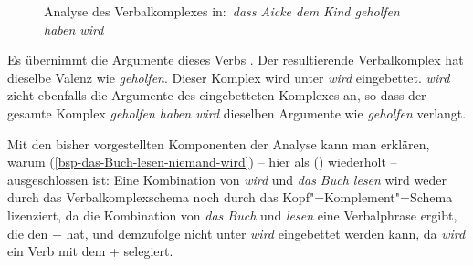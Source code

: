 \begin{figure}
\caption{Analyse des Verbalkomplexes in:\ \emph{dass Aicke dem Kind geholfen haben wird}}\label{abb-kombin1}%
\end{figure}
Es übernimmt die Argumente dieses Verbs . Der resultierende Verbalkomplex hat dieselbe
Valenz wie \emph{geholfen}. Dieser Komplex wird unter \emph{wird} eingebettet. \emph{wird} zieht
ebenfalls die Argumente des eingebetteten Komplexes an, so dass der gesamte Komplex \emph{geholfen haben wird}
dieselben Argumente wie \emph{geholfen} verlangt.

Mit den bisher vorgestellten Komponenten der Analyse kann man erklären, warum
(\ref{bsp-das-Buch-lesen-niemand-wird}) -- hier als () wiederholt --
ausgeschlossen ist:
\z
Eine Kombination von \emph{wird} und \emph{das Buch lesen} wird weder durch das Verbalkomplexschema
noch durch das Kopf"=Komplement"=Schema lizenziert, da die Kombination von \emph{das Buch} und \emph{lesen} 
eine Verbalphrase ergibt, die den \lexw $-$ hat, 
und demzufolge nicht unter \emph{wird} eingebettet werden kann, da \emph{wird} ein Verb mit
dem \lexw + selegiert.

